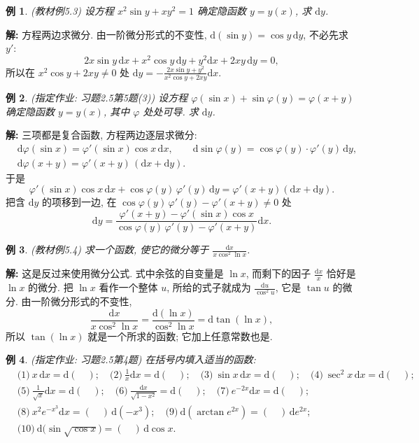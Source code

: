 \documentclass[UTF8,openany]{ctexbook}
\theoremstyle{chinesetextbook}
\newtheorem{example}{例}[section]
\newenvironment{cnsolution}{\par\indent\textbf{解:} \ignorespaces}{\par}
\newcommand{\dd}{\mathrm d}
\begin{document}
\begin{example}\label{ex:c2-5-3}
\textnormal{(教材例5.3)} 设方程 $x^2\sin y+xy^2=1$ 确定隐函数 $y=y(x)$, 求 $\dd y$.
\end{example}
\begin{cnsolution}
方程两边求微分. 由一阶微分形式的不变性, $\dd(\sin y)=\cos y\,\dd y$, 不必先求 $y'$:
\[
2x\sin y\,\dd x+x^2\cos y\,\dd y+y^2\dd x+2xy\,\dd y=0,
\]
所以在 $x^2\cos y+2xy\ne0$ 处 $\displaystyle\dd y=-\frac{2x\sin y+y^2}{x^2\cos y+2xy}\dd x$.
\end{cnsolution}
\begin{example}\label{ex:c2-h5-5}
\textnormal{(指定作业: 习题2.5第5题(3))} 设方程 $\varphi(\sin x)+\sin\varphi(y)=\varphi(x+y)$ 确定隐函数 $y=y(x)$, 其中 $\varphi$ 处处可导. 求 $\dd y$.
\end{example}
\begin{cnsolution}
三项都是复合函数, 方程两边逐层求微分:
\[
\begin{aligned}
&\dd\varphi(\sin x)=\varphi'(\sin x)\cos x\,\dd x,\qquad\dd\sin\varphi(y)=\cos\varphi(y)\cdot\varphi'(y)\,\dd y,\\
&\dd\varphi(x+y)=\varphi'(x+y)\,(\dd x+\dd y).
\end{aligned}
\]
于是
\[
\varphi'(\sin x)\cos x\,\dd x+\cos\varphi(y)\,\varphi'(y)\,\dd y=\varphi'(x+y)(\dd x+\dd y).
\]
把含 $\dd y$ 的项移到一边, 在 $\cos\varphi(y)\,\varphi'(y)-\varphi'(x+y)\ne0$ 处
\[
\dd y=\frac{\varphi'(x+y)-\varphi'(\sin x)\cos x}{\cos\varphi(y)\,\varphi'(y)-\varphi'(x+y)}\dd x.
\]
\end{cnsolution}
\begin{example}\label{ex:c2-5-4}
\textnormal{(教材例5.4)} 求一个函数, 使它的微分等于 $\displaystyle\frac{\dd x}{x\cos^2\ln x}$.
\end{example}
\begin{cnsolution}
这是反过来使用微分公式. 式中余弦的自变量是 $\ln x$, 而剩下的因子 $\displaystyle\frac{\dd x}x$ 恰好是 $\ln x$ 的微分. 把 $\ln x$ 看作一个整体 $u$, 所给的式子就成为 $\displaystyle\frac{\dd u}{\cos^2u}$, 它是 $\tan u$ 的微分. 由一阶微分形式的不变性,
\[
\frac{\dd x}{x\cos^2\ln x}=\frac{\dd(\ln x)}{\cos^2\ln x}=\dd\tan(\ln x),
\]
所以 $\tan(\ln x)$ 就是一个所求的函数; 它加上任意常数也是.
\end{cnsolution}
\begin{example}\label{ex:c2-h5-4}
\textnormal{(指定作业: 习题2.5第4题)} 在括号内填入适当的函数:
\[
\begin{aligned}
&\text{(1)}\ x\,\dd x=\dd(\quad);\quad\text{(2)}\ \frac1x\dd x=\dd(\quad);\quad\text{(3)}\ \sin x\,\dd x=\dd(\quad);\quad\text{(4)}\ \sec^2x\,\dd x=\dd(\quad);\\
&\text{(5)}\ \frac1{\sqrt x}\dd x=\dd(\quad);\quad\text{(6)}\ \frac{\dd x}{\sqrt{1-x^2}}=\dd(\quad);\quad\text{(7)}\ e^{-2x}\dd x=\dd(\quad);\\
&\text{(8)}\ x^2e^{-x^3}\dd x=(\quad)\,\dd(-x^3);\quad\text{(9)}\ \dd(\arctan e^{2x})=(\quad)\,\dd e^{2x};\\
&\text{(10)}\ \dd\bigl(\sin\sqrt{\cos x}\bigr)=(\quad)\,\dd\cos x.
\end{aligned}
\]
\end{example}
\end{document}
